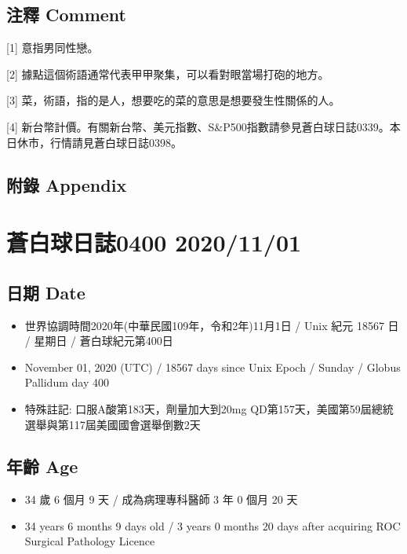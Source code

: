\documentclass[
]{article}
\providecommand{\tightlist}{%
  \setlength{\itemsep}{0pt}\setlength{\parskip}{0pt}}
\begin{document}
\hypertarget{ux6ce8ux91cb-comment-57}{%
\subsection{注釋 Comment}\label{ux6ce8ux91cb-comment-57}}

{[}1{]} 意指男同性戀。

{[}2{]} 據點這個術語通常代表甲甲聚集，可以看對眼當場打砲的地方。

{[}3{]} 菜，術語，指的是人，想要吃的菜的意思是想要發生性關係的人。

{[}4{]}
新台幣計價。有關新台幣、美元指數、S\&P500指數請參見蒼白球日誌0339。本日休市，行情請見蒼白球日誌0398。

\hypertarget{ux9644ux9304-appendix-57}{%
\subsection{附錄 Appendix}\label{ux9644ux9304-appendix-57}}

\hypertarget{ux84bcux767dux7403ux65e5ux8a8c0400-20201101}{%
\section{蒼白球日誌0400
2020/11/01}\label{ux84bcux767dux7403ux65e5ux8a8c0400-20201101}}

\hypertarget{ux65e5ux671f-date-58}{%
\subsection{日期 Date}\label{ux65e5ux671f-date-58}}

\begin{itemize}
\tightlist
\item
  世界協調時間2020年(中華民國109年，令和2年)11月1日 / Unix 紀元 18567 日
  / 星期日 / 蒼白球紀元第400日
\item
  November 01, 2020 (UTC) / 18567 days since Unix Epoch / Sunday /
  Globus Pallidum day 400
\item
  特殊註記: 口服A酸第183天，劑量加大到20mg
  QD第157天，美國第59屆總統選舉與第117屆美國國會選舉倒數2天
\end{itemize}

\hypertarget{ux5e74ux9f61-age-58}{%
\subsection{年齡 Age}\label{ux5e74ux9f61-age-58}}

\begin{itemize}
\tightlist
\item
  34 歲 6 個月 9 天 / 成為病理專科醫師 3 年 0 個月 20 天
\item
  34 years 6 months 9 days old / 3 years 0 months 20 days after
  acquiring ROC Surgical Pathology Licence
\end{itemize}
\end{document}
